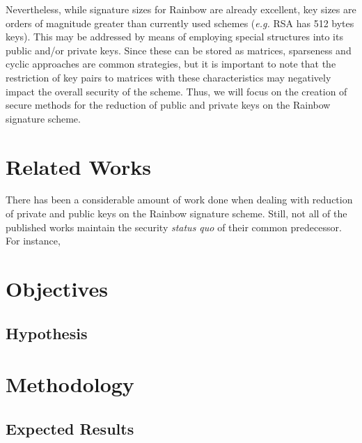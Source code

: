 \documentclass[10pt]{article}
\begin{document}
Nevertheless, while signature sizes for Rainbow are already excellent, key sizes are orders of magnitude greater than currently used schemes (\emph{e.g.} RSA has 512 bytes keys). This may be addressed by means of employing special structures into its public and/or private keys. Since these can be stored as matrices, sparseness and cyclic approaches are common strategies, but it is important to note that the restriction of key pairs to matrices with these characteristics may negatively impact the overall security of the scheme. Thus, we will focus on the creation of secure methods for the reduction of public and private keys on the Rainbow signature scheme.

\section{Related Works}

There has been a considerable amount of work done when dealing with reduction of private and public keys on the Rainbow signature scheme. Still, not all of the published works maintain the security \emph{status quo} of their common predecessor. For instance, 

\section{Objectives}

\subsection{Hypothesis}

\section{Methodology}

\subsection{Expected Results}



\end{document}

